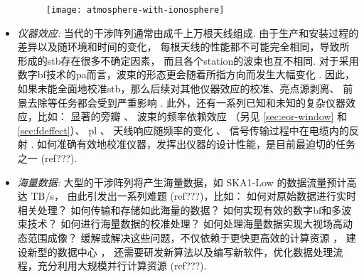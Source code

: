 \begin{itemize}
\begin{figure}[tbp]
  \centering
  \texttt{[image: atmosphere-with-ionosphere]}
  \label{fig:ionosphere}
\end{figure}

\item
\emph{仪器效应:}
当代的干涉阵列通常由成千上万根天线组成. 由于生产和安装过程的差异以及随环境和时间的变化，
每根天线的性能都不可能完全相同，导致所形成的\acl{stb}存在很多不确定因素，
而且各个\acl{station}的波束也互不相同.
对于采用数字\acl{bf}技术的\acl{pa}而言，波束的形态更会随着所指方向而发生大幅变化
\cite{smirnov2011iii,vanWeeren2016,jagannathan2017}.
因此，如果未能全面地校准\acl{stb}，那么后续对其他仪器效应的校准、亮点源剥离、
前景去除等任务都会受到严重影响 \cite{noordam2004,neben2016}.
此外，还有一系列已知和未知的复杂仪器效应，比如：
显著的旁瓣 \cite{thyagarajan2015,mort2017}、
波束的频率依赖效应 \cite{liu2009ps,datta2010,morales2012}
（另见 \autoref{sec:eor-window} 和 \autoref{sec:fdeffect}）、
\acl{pl} \cite{asad2016,asad2018,lenc2017}、
天线响应随频率的变化 \cite{bernardi2015,trott2017}、
信号传输过程中在电缆内的反射 \cite{beardsley2016}.
如何准确有效地校准仪器，发挥出仪器的设计性能，是目前最迫切的任务之一
\cite{wijnholds2010} (ref???).

\item
\emph{海量数据:}
大型的干涉阵列将产生海量数据，如 SKA1-Low 的数据流量预计高达 TB/s，
由此引发出一系列难题 \cite{norris2011} (ref???)，比如：
如何对原始数据进行实时相关处理？
如何传输和存储如此海量的数据？
如何实现有效的数字\acl{bf}和多波束技术？
如何进行海量数据的校准处理？
如何处理海量数据实现大视场高动态范围成像？
缓解或解决这些问题，不仅依赖于更快更高效的计算资源 \cite{magro2014,vermij2017}，
建设新型的数据中心 \cite{chrysostomou2018}，
还需要研发新算法以及编写新软件，优化数据处理流程，充分利用大规模并行计算资源
\cite{morales2009,gunst2018} (ref???).

\end{itemize}


